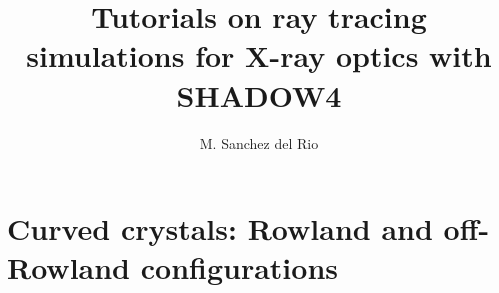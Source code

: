 \documentclass{ol-softwaremanual}
\title{Tutorials on ray tracing simulations for X-ray optics with SHADOW4}
\author{M. Sanchez del Rio}
\begin{document}
\maketitle

\tableofcontents

\newpage
\section{Curved crystals: Rowland and off-Rowland configurations}


\end{document}

